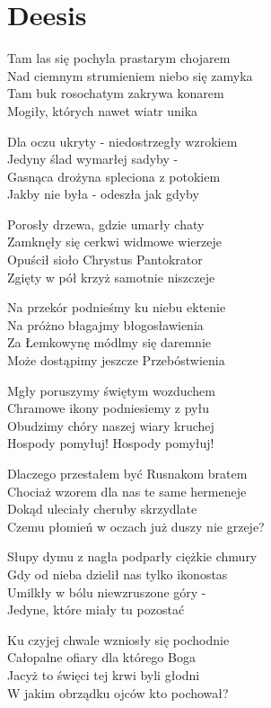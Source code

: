 \section{Deesis}
\begin{text}
    Tam las się pochyla prastarym chojarem\\
    Nad ciemnym strumieniem niebo się zamyka\\
    Tam buk rosochatym zakrywa konarem\\
    Mogiły, których nawet wiatr unika

    Dla oczu ukryty - niedostrzegły wzrokiem\\
    Jedyny ślad wymarłej sadyby -\\
    Gasnąca drożyna spleciona z potokiem\\
    Jakby nie była - odeszła jak gdyby

    Porosły drzewa, gdzie umarły chaty\\
    Zamknęły się cerkwi widmowe wierzeje\\
    Opuścił sioło Chrystus Pantokrator\\
    Zgięty w pół krzyż samotnie niszczeje

    \vin Na przekór podnieśmy ku niebu ektenie\\
    \vin Na próżno błagajmy błogosławienia\\
    \vin Za Łemkowynę módlmy się daremnie\\
    \vin Może dostąpimy jeszcze Przebóstwienia

    \vin Mgły poruszymy świętym wozduchem\\
    \vin Chramowe ikony podniesiemy z pyłu\\
    \vin Obudzimy chóry naszej wiary kruchej\\
    \vin Hospody pomyłuj! Hospody pomyłuj!

    Dlaczego przestałem być Rusnakom bratem\\
    Chociaż wzorem dla nas te same hermeneje\\
    Dokąd uleciały cheruby skrzydlate\\
    Czemu płomień w oczach już duszy nie grzeje?

    Słupy dymu z nagła podparły ciężkie chmury\\
    Gdy od nieba dzielił nas tylko ikonostas\\
    Umilkły w bólu niewzruszone góry -\\
    Jedyne, które miały tu pozostać

    Ku czyjej chwale wzniosły się pochodnie\\
    Całopalne ofiary dla którego Boga\\
    Jacyż to święci tej krwi byli głodni\\
    W jakim obrządku ojców kto pochował?


\end{text}

